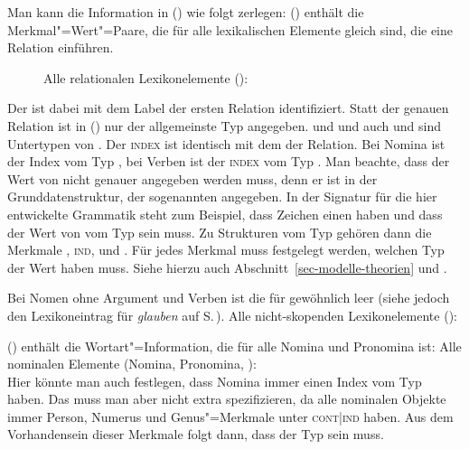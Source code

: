 Man kann die Information in () wie folgt zerlegen: () enthält 
die Merkmal"=Wert"=Paare, die für alle lexikalischen Elemente gleich sind, die eine Relation
einführen.
%
\begin{figure}
\ea
\label{relational-le}%
Alle relationalen Lexikonelemente ():\\
\z
\vspace{-\baselineskip}
\end{figure}
Der \ltopw ist dabei mit dem Label der ersten Relation identifiziert. Statt der genauen Relation ist
in () nur der allgemeinste Typ angegeben.  und  und auch 
und  sind Untertypen von .
Der \textsc{index} ist
identisch mit dem \argzero der Relation. Bei Nomina ist der Index vom Typ , bei Verben ist der
\textsc{index} vom Typ . Man beachte, dass der Wert von \ltop nicht genauer angegeben
werden muss, denn er ist in der Grunddatenstruktur, der sogenannten  angegeben. In
der Signatur für die hier entwickelte Grammatik steht zum Beispiel, dass Zeichen einen \contw haben
und dass der Wert von \cont vom Typ  sein muss. Zu Strukturen vom Typ  gehören
dann die Merkmale \ltop, \textsc{ind}, \rels und \hcons. Für jedes Merkmal muss festgelegt werden,
welchen Typ der Wert haben muss. Siehe hierzu auch Abschnitt~\ref{sec-modelle-theorien} und .

Bei Nomen ohne Argument und Verben ist die \hconsl für
gewöhnlich leer (siehe jedoch den Lexikoneintrag für \emph{glauben} auf S.\,\pageref{le-glauben}).
\ea
Alle nicht-skopenden Lexikonelemente ():\\
\z

\noindent
() enthält die Wortart"=Information, die für alle Nomina und Pronomina  ist:
\ea
Alle nominalen Elemente (Nomina, Pronomina, ):\\
\z
Hier könnte man auch festlegen, dass Nomina immer einen Index vom Typ  haben. Das muss
man aber nicht extra spezifizieren, da alle nominalen Objekte immer Person, Numerus und
Genus"=Merkmale unter \textsc{cont|ind} haben. Aus dem Vorhandensein dieser Merkmale folgt dann,
dass der Typ  sein muss.

